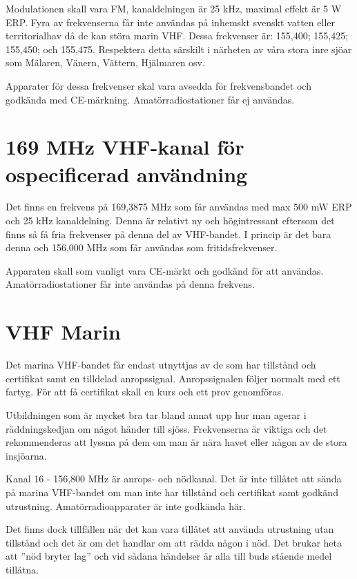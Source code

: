 Modulationen skall vara FM, kanaldelningen är 25 kHz, maximal effekt är 5 W ERP. Fyra av frekvenserna får inte användas på inhemskt svenskt vatten eller territorialhav då de kan störa marin VHF. Dessa frekvenser är: 155,400; 155,425; 155,450; och 155,475. Respektera detta särskilt i närheten av våra stora inre sjöar som Mälaren, Vänern, Vättern, Hjälmaren osv.

Apparater för dessa frekvenser skal vara avsedda för frekvensbandet och godkända med CE-märkning. Amatörradiostationer får ej användas.


\section{169 MHz VHF-kanal för ospecificerad användning}

Det finns en frekvens på 169,3875 MHz som får användas med max 500 mW ERP och 25 kHz kanaldelning. Denna är relativt ny och högintressant eftersom det finns så få fria frekvenser på denna del av VHF-bandet. I princip är det bara denna och 156,000 MHz som får användas som fritidsfrekvenser.

Apparaten skall som vanligt vara CE-märkt och godkänd för att användas. Amatörradiostationer får inte användas på denna frekvens.

\section{VHF Marin}

Det marina VHF-bandet får endast utnyttjas av de som har tillstånd och certifikat samt en tilldelad anropssignal. Anropssignalen följer normalt med ett fartyg. För att få certifikat skall en kurs och ett prov genomföras.

Utbildningen som är mycket bra tar bland annat upp hur man agerar i räddningskedjan om något händer till sjöss. Frekvenserna är viktiga och det rekommenderas att lyssna på dem om man är nära havet eller någon av de stora insjöarna.

Kanal 16 - 156,800 MHz är anrops- och nödkanal. Det är inte tillåtet att sända på marina VHF-bandet om man inte har tillstånd och certifikat samt godkänd utrustning. Amatörradioapparater är inte godkända här.

Det finns dock tillfällen när det kan vara tillåtet att använda utrustning utan tillstånd och det är om det handlar om att rädda någon i nöd. Det brukar heta att ''nöd bryter lag'' och vid sådana händelser är alla till buds stående medel tillåtna.

